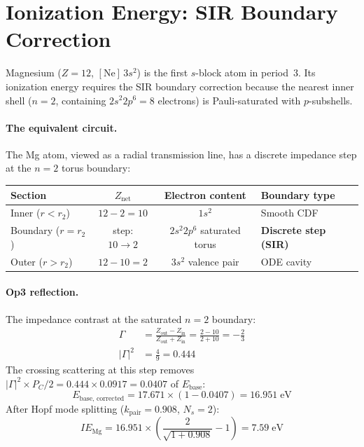\section{Ionization Energy: SIR Boundary Correction}
\label{sec:mg_ie}

Magnesium ($Z = 12$, $[\text{Ne}]\,3s^2$) is the first $s$-block atom in period~3.  Its ionization energy requires the SIR boundary correction because the nearest inner shell ($n = 2$, containing $2s^2 2p^6 = 8$ electrons) is Pauli-saturated with $p$-subshells.

\paragraph{The equivalent circuit.}
The Mg atom, viewed as a radial transmission line, has a discrete impedance step at the $n = 2$ torus boundary:
\begin{center}
\small
\begin{tabularx}{\textwidth}{@{}lccX@{}}
\toprule
\textbf{Section} & \textbf{$Z_\text{net}$} & \textbf{Electron content} & \textbf{Boundary type} \\
\midrule
Inner ($r < r_2$) & $12 - 2 = 10$ & $1s^2$ & Smooth CDF \\
Boundary ($r = r_2$) & step: $10 \to 2$ & $2s^2 2p^6$ saturated torus & \textbf{Discrete step (SIR)} \\
Outer ($r > r_2$) & $12 - 10 = 2$ & $3s^2$ valence pair & ODE cavity \\
\bottomrule
\end{tabularx}
\end{center}

\paragraph{Op3 reflection.}
The impedance contrast at the saturated $n = 2$ boundary:
\begin{align}
    \Gamma &= \frac{Z_\text{out} - Z_\text{in}}{Z_\text{out} + Z_\text{in}} = \frac{2 - 10}{2 + 10} = -\frac{2}{3}  \\
    |\Gamma|^2 &= \frac{4}{9} = 0.444
\end{align}
The crossing scattering at this step removes $|\Gamma|^2 \times P_C/2 = 0.444 \times 0.0917 = 0.0407$ of $E_\text{base}$:
\begin{equation}
    E_\text{base, corrected} = 17.671 \times (1 - 0.0407) = 16.951\;\text{eV}
\end{equation}
After Hopf mode splitting ($k_\text{pair} = 0.908$, $N_s = 2$):
\begin{equation}
    IE_\text{Mg} = 16.951 \times \left(\frac{2}{\sqrt{1 + 0.908}} - 1\right) = 7.59\;\text{eV}
\end{equation}

